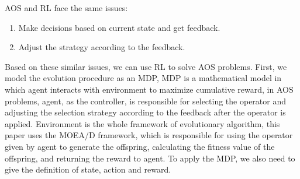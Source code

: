 \documentclass[journal]{IEEEtran}
\begin{document}
AOS and RL face the same issues:
\begin{enumerate}
  \item Make decisions based on current state and get feedback.
  \item Adjust the strategy according to the feedback.
\end{enumerate}
Based on these similar issues, we can use RL to solve AOS problems.
First, we model the evolution procedure as an MDP,
MDP is a mathematical model in which agent interacts with environment to maximize cumulative reward, in AOS problems, agent, as the controller, is responsible for selecting the operator and adjusting the selection strategy according to the feedback after the operator is applied.
Environment is the whole framework of evolutionary algorithm, this paper uses the MOEA/D framework, which is responsible for using the operator given by agent to generate the offspring, calculating the fitness value of the offspring, and returning the reward to agent.
To apply the MDP, we also need to give the definition of state, action and reward.
\end{document}

